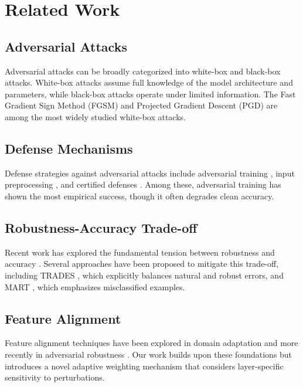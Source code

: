 \section{Related Work}
\label{sec:related_work}

\subsection{Adversarial Attacks}
Adversarial attacks can be broadly categorized into white-box and black-box attacks. White-box attacks \cite{goodfellow2014explaining, kurakin2016adversarial, madry2017towards} assume full knowledge of the model architecture and parameters, while black-box attacks \cite{papernot2017practical, chen2017zoo} operate under limited information. The Fast Gradient Sign Method (FGSM) \cite{goodfellow2014explaining} and Projected Gradient Descent (PGD) \cite{madry2017towards} are among the most widely studied white-box attacks.

\subsection{Defense Mechanisms}
Defense strategies against adversarial attacks include adversarial training \cite{madry2017towards, wong2020fast}, input preprocessing \cite{guo2017countering, liao2018defense}, and certified defenses \cite{cohen2019certified, wong2018provable}. Among these, adversarial training has shown the most empirical success, though it often degrades clean accuracy.

\subsection{Robustness-Accuracy Trade-off}
Recent work has explored the fundamental tension between robustness and accuracy \cite{tsipras2018robustness, zhang2019theoretically}. Several approaches have been proposed to mitigate this trade-off, including TRADES \cite{zhang2019theoretically}, which explicitly balances natural and robust errors, and MART \cite{wang2019improving}, which emphasizes misclassified examples.

\subsection{Feature Alignment}
Feature alignment techniques have been explored in domain adaptation \cite{ganin2016domain, tzeng2017adversarial} and more recently in adversarial robustness \cite{zhang2019feature, xie2019feature}. Our work builds upon these foundations but introduces a novel adaptive weighting mechanism that considers layer-specific sensitivity to perturbations.